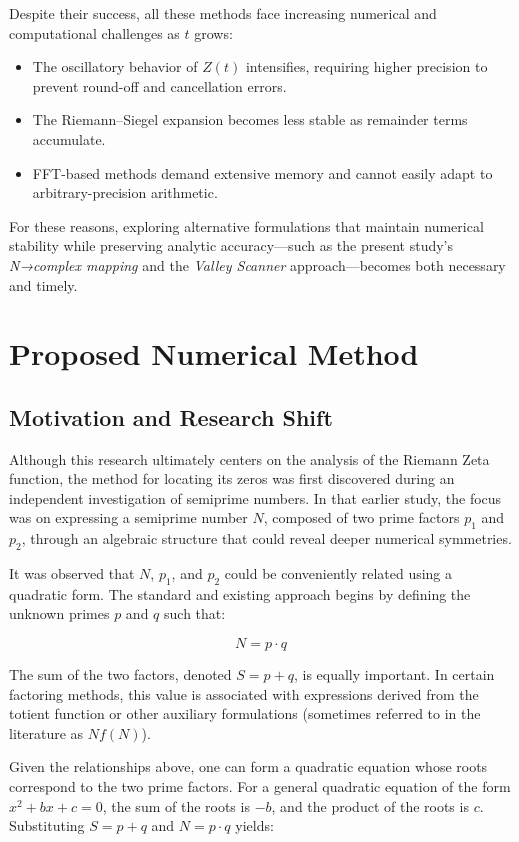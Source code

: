 \documentclass[11pt,a4paper]{article}
\begin{document}
Despite their success, all these methods face increasing numerical and computational challenges as \( t \) grows:
\begin{itemize}
    \item The oscillatory behavior of \( Z(t) \) intensifies, requiring higher precision to prevent round-off and cancellation errors.
    \item The Riemann–Siegel expansion becomes less stable as remainder terms accumulate.
    \item FFT-based methods demand extensive memory and cannot easily adapt to arbitrary-precision arithmetic.
\end{itemize}

For these reasons, exploring alternative formulations that maintain numerical stability while preserving analytic accuracy—such as the present study’s \emph{N→complex mapping} and the \emph{Valley Scanner} approach—becomes both necessary and timely.

\section{Proposed Numerical Method}
\label{sec:method}

\subsection{Motivation and Research Shift}
Although this research ultimately centers on the analysis of the Riemann Zeta function, 
the method for locating its zeros was first discovered during an independent investigation of semiprime numbers. 
In that earlier study, the focus was on expressing a semiprime number \( N \), 
composed of two prime factors \( p_1 \) and \( p_2 \), through an algebraic structure that could reveal deeper numerical symmetries.

\medskip
\noindent
It was observed that \( N \), \( p_1 \), and \( p_2 \) could be conveniently related using a quadratic form. 
The standard and existing approach begins by defining the unknown primes \( p \) and \( q \) such that:

\[
N = p \cdot q
\]

The sum of the two factors, denoted \( S = p + q \), is equally important.  
In certain factoring methods, this value is associated with expressions derived from the totient function or other auxiliary formulations (sometimes referred to in the literature as \( Nf(N) \)).

\medskip
\noindent
Given the relationships above, one can form a quadratic equation whose roots correspond to the two prime factors.  
For a general quadratic equation of the form \( x^{2} + bx + c = 0 \), the sum of the roots is \( -b \), and the product of the roots is \( c \).  
Substituting \( S = p + q \) and \( N = p \cdot q \) yields:
\end{document}
